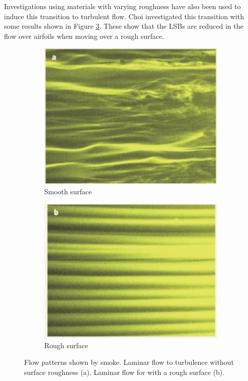 Investigations using materials with varying roughness have also been used to induce this transition to turbulent flow. Choi investigated this transition with some results shown in Figure \ref{fig:rough}. These show that the LSBs are reduced in the flow over airfoils when moving over a rough surface.

\begin{figure}[H]
     \centering
     \begin{subfigure}[b]{0.45\textwidth}
         \centering
         \includegraphics[width=\textwidth]{03_LiteratureReview/Figs/a2.JPG}
         \caption{Smooth surface}
         \label{fig:Ps2a}
     \end{subfigure}
     \hfill
     \begin{subfigure}[b]{0.45\textwidth}
         \centering
         \includegraphics[width=\textwidth]{03_LiteratureReview/Figs/b2.JPG}
         \caption{Rough surface}
         \label{fig:Ps2b}
     \end{subfigure}
     \hfill
           \caption{Flow patterns shown by smoke. Laminar flow to turbulence without surface roughness (a). Laminar flow for with a rough surface (b).  \cite{Choi2006}}
  \label{fig:rough}
\end{figure}







